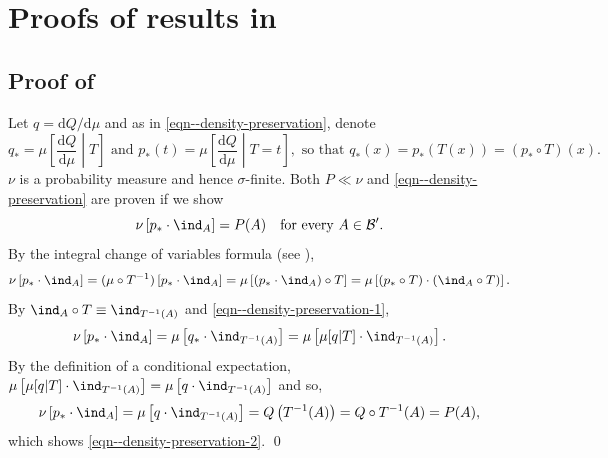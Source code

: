 
\section{Proofs of results in }

\subsection{Proof of }
\label{sec--prf--lem--density-preservation}

Let \(q = \mathrm{d} Q / \mathrm{d} \mu\) and as in
\eqref{eqn--density-preservation}, denote
\begin{equation}
  q_{\ast} = \mu \left[ \frac{\mathrm{d} Q}{\mathrm{d} \mu} \middle| T \right]
  \text{ and } p_{\ast} (t) = \mu \left[ \frac{\mathrm{d}
  Q}{\mathrm{d} \mu} \middle| T = t \right], \text{ so that } q_{\ast} (x) =
  p_{\ast} (T (x)) = \left( p_{\ast} \circ T \right) (x).
  \label{eqn--density-preservation-1}
\end{equation}
\(\nu\) is a probability measure and hence \(\sigma\)-finite.
Both \(P \ll \nu\) and \eqref{eqn--density-preservation} are proven if we show
\begin{equation}
  \nu \left[ p_{\ast} \cdot \ind_{A} \right] = P (A) \quad \text{for
  every } A \in \mathcal{B}^{\prime}.
  \label{eqn--density-preservation-2}
\end{equation}
By the integral change of variables formula
(see \citet[Theorem 3.6.1]{2007bogachevMeasureTheory}),
\begin{equation*}
  \nu \left[ p_{\ast} \cdot \ind_{A} \right] = (\mu \circ T^{- 1}) \left[
  p_{\ast} \cdot \ind_{A} \right] = \mu \left[ \left( p_{\ast} \cdot
  \ind_{A} \right) \circ T \right] = \mu \left[ \left( p_{\ast} \circ T
  \right) \cdot \left( \ind_{A} \circ T \right) \right].
\end{equation*}
By \(\ind_{A} \circ T \equiv \ind_{T^{- 1} (A)}\) and
\eqref{eqn--density-preservation-1},
\begin{equation*}
  \nu \left[ p_{\ast} \cdot \ind_{A} \right] = \mu \left[ q_{\ast}
  \cdot \ind_{T^{- 1} (A)} \right] = \mu \left[ \mu [q | T] \cdot
  \ind_{T^{- 1} (A)} \right].
\end{equation*}
By the definition of a conditional expectation,
\(\mu \left[ \mu [q | T] \cdot \ind_{T^{- 1} (A)} \right] = \mu \left[ q
\cdot \ind_{T^{- 1} (A)} \right]\) and so,
\begin{equation*}
  \nu \left[ p_{\ast} \cdot \ind_{A} \right] =
  \mu \left[ q \cdot \ind_{T^{- 1} (A)} \right] = Q \left( T^{- 1}
  (A) \right) = Q \circ T^{- 1} (A) =
  P (A),
\end{equation*}
which shows \eqref{eqn--density-preservation-2}.
\qed

